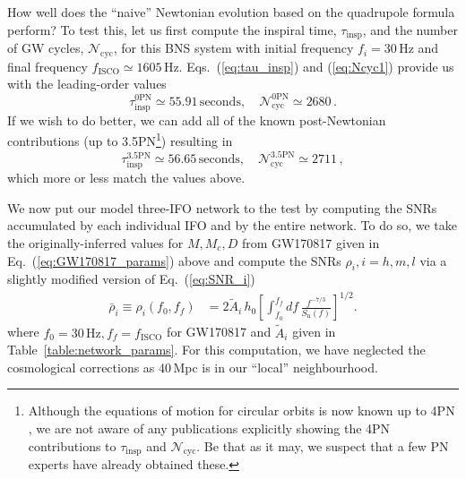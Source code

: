 \documentclass[prd,amsmath,amssymb,aps,floats,amsfonts,notitlepage,superscriptaddress,eqsecnum,nofootinbib,10pt]{revtex4-1}
\newcommand{\f}{\frac}
\newcommand{\be}{\begin{equation}}
\newcommand{\ee}{\end{equation}}
\begin{document}
How well does the ``naive'' Newtonian evolution based on the quadrupole formula perform? 
To test this, let us first compute the inspiral time, $\tau_\text{insp}$, and the number of GW cycles, $\mathcal{N}_\text{cyc}$, for this BNS system with initial frequency $f_i=30\,$Hz and final frequency $f_\text{ISCO} \simeq 1605\,$Hz. 
Eqs.~(\ref{eq:tau_insp}) and (\ref{eq:Ncyc1}) provide us with the leading-order values
%
\be
\tau_\text{insp}^{0\text{PN}} \simeq 55.91\,\text{seconds}, \quad \mathcal{N}_\text{cyc}^{0\text{PN}} \simeq 2680\,\label{eq:GW170817_values_0PN}. 
\ee
%
If we wish to do better, we can add all of the known post-Newtonian contributions 
(up to 3.5PN\footnote{Although the equations of motion for circular orbits is now known up to 4PN \cite{4PN_EoM_paper}, we are not aware of any publications
explicitly showing the 4PN contributions to $\tau_\text{insp}$ and $\mathcal{N}_\text{cyc}$. Be that as it may, we suspect that a few PN experts have already obtained these.}) resulting in
%
\be
\tau_\text{insp}^{3.5\text{PN}} \simeq 56.65\,\text{seconds}, \quad \mathcal{N}_\text{cyc}^{3.5\text{PN}} \simeq 2711 \label{eq:GW170817_values_3p5PN}\, ,
\ee
%
which more or less match the values above. %

We now put our model three-IFO network to the test
by computing the SNRs accumulated by each individual IFO and by the entire network. To do so, we take the originally-inferred values for $M,M_c,D$ from GW170817 given in Eq.~(\ref{eq:GW170817_params}) above and compute the SNRs $\rho_i, i=h,m,l$ via a slightly modified version of Eq.~(\ref{eq:SNR_i})
%
\begin{align}
\bar{\rho}_i\equiv\rho_i(f_0,f_f) &= 2\tilde{A}_i\, h_0\left[ \int_{f_0}^{f_f} df\, \f{f^{-7/3}}{S_\text{n}(f)}\right]^{1/2} \label{eq:SNR_i_with_fi}.
\end{align}
%
where $f_0 =30\,\text{Hz}, f_f= f_\text{ISCO}$ for GW170817 and $\tilde{A}_i$ given in Table~\ref{table:network_params}.
For this computation, we have neglected the cosmological corrections as 40\,Mpc is in our ``local'' neighbourhood.
\end{document}
